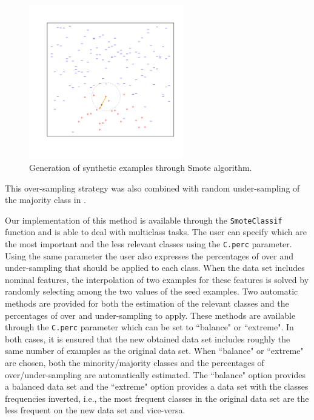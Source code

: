 \documentclass[10pt,a4paper]{article}\usepackage[]{graphicx}\usepackage[]{color}
\newenvironment{knitrout}{}{} %
\begin{document}
\begin{knitrout}\footnotesize
{}\color{fgcolor}\begin{figure}

{\centering \includegraphics[width=0.6\textwidth,height=0.3\textheight]{figures/UBL-smote_illust-1} 

}

\caption[Generation of synthetic examples through Smote algorithm]{Generation of synthetic examples through Smote algorithm.\label{smote_illust}}\label{fig:smote_illust}
\end{figure}


\end{knitrout}

This over-sampling strategy was also combined with random under-sampling of the majority class in \cite{CBOK02}. 


Our implementation of this method is available through the \texttt{SmoteClassif} function and is able to deal with multiclass tasks. The user can specify which are the most important and the less relevant classes using the \texttt{C.perc} parameter. Using the same parameter the user also expresses the percentages of over and under-sampling that should be applied to each class. When the data set includes nominal features, the interpolation of two examples for these features is solved by randomly selecting among the two values of the seed examples. Two automatic methods are provided for both the estimation of the relevant classes and the percentages of over and under-sampling to apply. These methods are available through the \texttt{C.perc} parameter which can be set to ``balance" or ``extreme". In both cases, it is ensured that the new obtained data set includes roughly the same number of examples as the original data set. When ``balance" or ``extreme" are chosen, both the minority/majority classes and the percentages of over/under-sampling are automatically estimated. The ``balance" option provides a balanced data set and the ``extreme" option provides a data set with the classes frequencies inverted, i.e., the most frequent classes in the original data set are the less frequent on the new data set and vice-versa.
\end{document}
